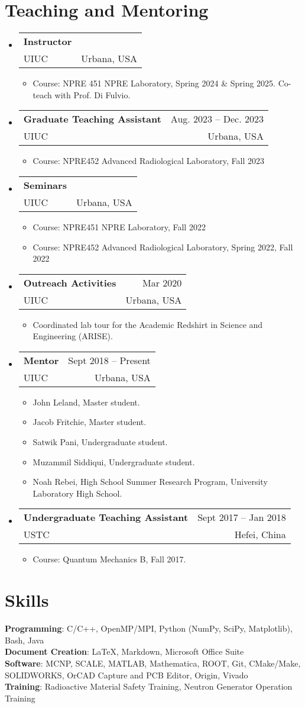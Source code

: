 \documentclass[letterpaper,11pt]{article} %
\makeatletter
\newcommand{\CVItem}[1]{
  \item\small{
    {#1 \vspace{-2pt}}
  }
}
\newcommand{\CVSubheading}[4]{
  \vspace{-2pt}\item
    \begin{tabular*}{0.97\textwidth}[t]{l@{\extracolsep{\fill}}r}
      \textbf{#1} & \footnotesize #2 \\
      \footnotesize #3 & \footnotesize #4 \\
    \end{tabular*}\vspace{-7pt}
}
\newcommand{\CVSubHeadingListStart}{\begin{itemize}[leftmargin=0.5cm, label={}]}
\newcommand{\CVSubHeadingListEnd}{\end{itemize}}
\newcommand{\CVItemListStart}{\begin{itemize}[rightmargin=\dimexpr\linewidth-15cm-\leftmargin\relax]}
\newcommand{\CVItemListEnd}{\end{itemize}\vspace{-5pt}}
\makeatother
\begin{document}
\section{Teaching and Mentoring}
\CVSubHeadingListStart
    \CVSubheading
    {Instructor}{ }
    {UIUC}{Urbana, USA}
    \CVItemListStart
      \CVItem{Course: NPRE 451 NPRE Laboratory, Spring 2024 \& Spring 2025. Co-teach with Prof. Di Fulvio.}
    \CVItemListEnd
    \CVSubheading
      {Graduate Teaching Assistant}{Aug. 2023 – Dec. 2023}
      {UIUC}{Urbana, USA}
      \CVItemListStart
        \CVItem{Course: NPRE452 Advanced Radiological Laboratory, Fall 2023}
      \CVItemListEnd
    \CVSubheading
      {Seminars}{}
      {UIUC}{Urbana, USA}
      \CVItemListStart
        \CVItem{Course: NPRE451 NPRE Laboratory, Fall 2022}
        \CVItem{Course: NPRE452 Advanced Radiological Laboratory, Spring 2022, Fall 2022}
      \CVItemListEnd
    \CVSubheading
      {Outreach Activities}{Mar 2020}
      {UIUC}{Urbana, USA}
      \CVItemListStart
        \CVItem{Coordinated lab tour for the Academic Redshirt in Science and Engineering (ARISE).}
      \CVItemListEnd
    \CVSubheading
      {Mentor}{Sept 2018 – Present}
      {UIUC}{Urbana, USA}
      \CVItemListStart
        \CVItem{John Leland, Master student.}
        \CVItem{Jacob Fritchie, Master student.}
        \CVItem{Satwik Pani, Undergraduate student.}
        \CVItem{Muzammil Siddiqui, Undergraduate student.}
        \CVItem{Noah Rebei, High School Summer Research Program, University Laboratory High School.}
      \CVItemListEnd
    \CVSubheading
      {Undergraduate Teaching Assistant}{Sept 2017 – Jan 2018}
      {USTC}{Hefei, China}
      \CVItemListStart
        \CVItem{Course: Quantum Mechanics B, Fall 2017.}
      \CVItemListEnd
  \CVSubHeadingListEnd

\begin{comment}
This section is compressed from the various skills sections that Euro CV
recommends.
\end{comment}

\section{Skills}
 \begin{itemize}[leftmargin=0.5cm, label={}]
    {\item{
     \textbf{Programming}{: C/C++, OpenMP/MPI, Python (NumPy, SciPy, Matplotlib), Bash, Java} \\
     \textbf{Document Creation}{: \LaTeX, Markdown, Microsoft Office Suite} \\
     \textbf{Software}{: MCNP, SCALE, MATLAB, Mathematica, ROOT, Git, CMake/Make, SOLIDWORKS, OrCAD Capture and PCB Editor, Origin, Vivado}\\
     \textbf{Training}{: Radioactive Material Safety Training, Neutron Generator Operation Training}
    }}
 \end{itemize}
\end{document}
